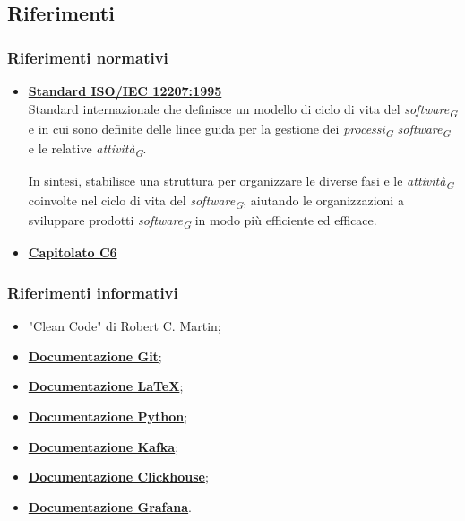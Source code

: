 \subsection{Riferimenti}
\subsubsection{Riferimenti normativi}
\begin{itemize}
    \item \href{https://www.math.unipd.it/~tullio/IS-1/2009/Approfondimenti/ISO_12207-1995.pdf}{\textbf{Standard ISO/IEC 12207:1995}} \\
    Standard internazionale che definisce un modello di ciclo di vita del \textit{software}\textsubscript{\textit{G}} e in cui sono definite delle linee guida per la gestione dei \textit{processi}\textsubscript{\textit{G}} \textit{software}\textsubscript{\textit{G}} e le relative \textit{attività}\textsubscript{\textit{G}}.
    
    In sintesi, stabilisce una struttura per organizzare le diverse fasi e le \textit{attività}\textsubscript{\textit{G}} coinvolte nel ciclo di vita del \textit{software}\textsubscript{\textit{G}}, aiutando le organizzazioni a sviluppare prodotti \textit{software}\textsubscript{\textit{G}} in modo più efficiente ed efficace.

    \item \href{https://www.math.unipd.it/~tullio/IS-1/2023/Progetto/C6.pdf}{\textbf{Capitolato C6}}

\end{itemize}

\subsubsection{Riferimenti informativi}
\begin{itemize}
    \item "Clean Code" di Robert C. Martin;
    \item \href{https://git-scm.com/docs}{\textbf{Documentazione Git}};
    \item \href{https://www.latex-project.org/help/documentation/}{\textbf{Documentazione \LaTeX}};
    \item \href{https://docs.python.org/3/}{\textbf{Documentazione Python}};
    \item \href{https://kafka.apache.org/documentation/}{\textbf{Documentazione Kafka}};
    \item \href{https://clickhouse.com/docs}{\textbf{Documentazione Clickhouse}};
    \item \href{https://grafana.com/docs/grafana/latest/}{\textbf{Documentazione Grafana}}.
\end{itemize}

